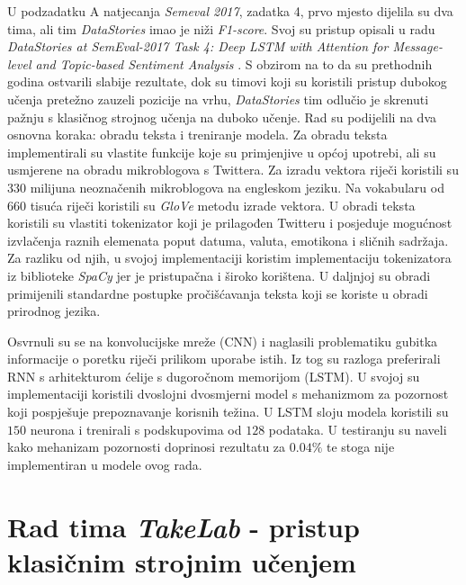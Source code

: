 \documentclass[times, utf8, zavrsni]{fer}
\begin{document}
U podzadatku A natjecanja \emph{Semeval 2017}, zadatka 4, prvo mjesto dijelila su dva tima, ali tim \textit{DataStories} imao je niži \textit{F1-score}. Svoj su pristup opisali u radu \textit{DataStories at SemEval-2017 Task 4: Deep LSTM with Attention for Message-level and Topic-based Sentiment Analysis} \citep{datastories-Semeval}. S obzirom na to da su prethodnih godina ostvarili slabije rezultate, dok su timovi koji su koristili pristup dubokog učenja pretežno zauzeli pozicije na vrhu, \textit{DataStories} tim odlučio je skrenuti pažnju s klasičnog strojnog učenja na duboko učenje. Rad su podijelili na dva osnovna koraka: obradu teksta i treniranje modela. Za obradu teksta implementirali su vlastite funkcije koje su primjenjive u općoj upotrebi, ali su usmjerene na obradu mikroblogova s Twittera. Za izradu vektora riječi koristili su $330$ milijuna neoznačenih mikroblogova na engleskom jeziku. Na vokabularu od $660$ tisuća riječi koristili su \textit{GloVe} metodu izrade vektora. U obradi teksta koristili su vlastiti tokenizator koji je prilagođen Twitteru i posjeduje mogućnost izvlačenja raznih elemenata poput datuma, valuta, emotikona i sličnih sadržaja. Za razliku od njih, u svojoj implementaciji koristim implementaciju tokenizatora iz biblioteke \textit{SpaCy} jer je pristupačna i široko korištena. U daljnjoj su obradi primijenili standardne postupke pročišćavanja teksta koji se koriste u obradi prirodnog jezika.

Osvrnuli su se na konvolucijske mreže (\gls{CNN}) i naglasili problematiku gubitka informacije o poretku riječi prilikom uporabe istih. Iz tog su razloga preferirali \gls{RNN} s arhitekturom ćelije s dugoročnom memorijom (\gls{LSTM}).  U svojoj su implementaciji koristili dvoslojni dvosmjerni model s mehanizmom za pozornost koji pospješuje prepoznavanje korisnih težina. U \gls{LSTM} sloju modela koristili su $150$ neurona i trenirali s podskupovima od $128$ podataka. U testiranju su naveli kako mehanizam pozornosti doprinosi rezultatu za $0.04\%$ te stoga nije implementiran u modele ovog rada.


\section{Rad tima \emph{TakeLab} - pristup klasičnim strojnim učenjem}
\end{document}
